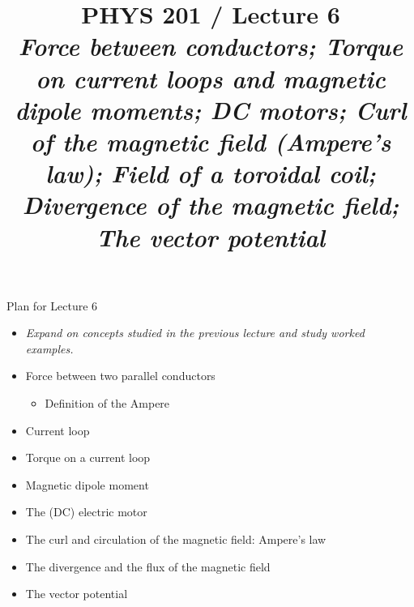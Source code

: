 \renewcommand{\prevlecture}{5 }
\renewcommand{\thislecture}{6 }
\renewcommand{\nextlecture}{7 }

%
%

\title[PHYS 201 / Lecture \thislecture]
{
  PHYS 201 / Lecture \thislecture\\
  {\it Force between conductors; Torque on current loops and magnetic dipole moments;
        DC motors; Curl of the magnetic field (Ampere's law); Field of a toroidal coil;
        Divergence of the magnetic field; The vector potential}\\
}



\begin{frame}[plain]
  \titlepage
\end{frame}


%
%

\renewcommand{\lecturesummarytitle}{Revision }


%
%


\begin{frame}{Plan for Lecture \thislecture}

\begin{itemize}
  \item {\it Expand on concepts studied in the previous lecture and study worked examples.}
  \vspace{0.2cm}
  \item Force between two parallel conductors
   \begin{itemize}
       \item Definition of the Ampere
   \end{itemize}
  \item Current loop
  \item Torque on a current loop
  \item Magnetic dipole moment
  \item The (DC) electric motor
  \item The curl and circulation of the magnetic field: Ampere's law
  \item The divergence and the flux of the magnetic field
  \item The vector potential
\end{itemize}


\end{frame}

